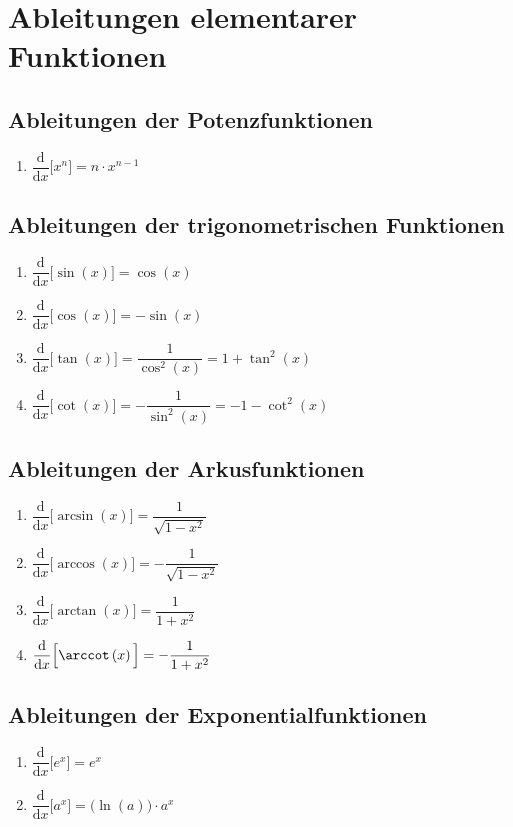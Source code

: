 \section{Ableitungen elementarer Funktionen}
\subsection{Ableitungen der Potenzfunktionen}
\begin{enumerate}[$(a)$]
\item $\dfrac{\text{d}}{\text{d}x}\Big[x^n\Big]=n\cdot x^{n-1}$
\end{enumerate}
\subsection{Ableitungen der trigonometrischen Funktionen}
\begin{enumerate}[$(a)$]
\item $\dfrac{\text{d}}{\text{d}x}\Big[\sin\left(x\right)\Big]=\cos\left(x\right)$
\item $\dfrac{\text{d}}{\text{d}x}\Big[\cos\left(x\right)\Big]=-\sin\left(x\right)$
\item $\dfrac{\text{d}}{\text{d}x}\Big[\tan\left(x\right)\Big]=\dfrac{1}{\cos^2\left(x\right)}=1+\tan^2\left(x\right)$
\item $\dfrac{\text{d}}{\text{d}x}\Big[\cot\left(x\right)\Big]=-\dfrac{1}{\sin^2\left(x\right)}=-1-\cot^2\left(x\right)$
\end{enumerate}
\subsection{Ableitungen der Arkusfunktionen}
\begin{enumerate}[$(a)$]
\item $\dfrac{\text{d}}{\text{d}x}\Big[\arcsin\left(x\right)\Big]=\dfrac{1}{\sqrt{1-x^2}}$
\item $\dfrac{\text{d}}{\text{d}x}\Big[\arccos\left(x\right)\Big]=-\dfrac{1}{\sqrt{1-x^2}}$
\item $\dfrac{\text{d}}{\text{d}x}\Big[\arctan\left(x\right)\Big]=\dfrac{1}{1+x^2}$
\item $\dfrac{\text{d}}{\text{d}x}\Big[\arccot\left(x\right)\Big]=-\dfrac{1}{1+x^2}$
\end{enumerate}
\subsection{Ableitungen der Exponentialfunktionen}
\begin{enumerate}[$(a)$]
\item $\dfrac{\text{d}}{\text{d}x}\Big[e^x\Big]=e^x$
\item $\dfrac{\text{d}}{\text{d}x}\Big[a^x\Big]=\Big(\ln\left(a\right)\Big)\cdot a^x$
\end{enumerate}
